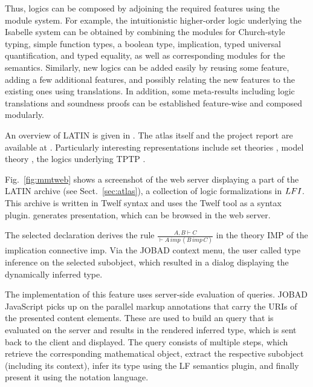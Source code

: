 Thus, logics can be composed by adjoining the required features using the {\mmt} module system.
For example, the intuitionistic higher-order logic underlying the Isabelle system \cite{isabelle} can be obtained by combining the modules for Church-style typing, simple function types, a boolean type, implication, typed universal quantification, and typed equality, as well as corresponding modules for the semantics.
Similarly, new logics can be added easily by reusing some feature, adding a few additional features, and possibly relating the new features to the existing ones using translations.
In addition, some meta-results including logic translations and soundness proofs can be established feature-wise and composed modularly.


An overview of LATIN is given in \cite{CHKMR:latinabs:11}.
The atlas itself and the project report are available at \cite{project:latin}.
Particularly interesting representations include set theories \cite{IR:foundations:10}, model theory \cite{HR:folsound:10}, the logics underlying TPTP \cite{BRS:tptphol:08}.

Fig.~\ref{fig:mmtweb} shows a screenshot of the {\mmt} web server displaying a part of the LATIN archive (see Sect.~\ref{sec:atlas}), a collection of logic formalizations in $LFI$.
This {\mmt} archive is written in Twelf syntax and uses the Twelf tool as a syntax plugin.
{\mmt} generates presentation, which can be browsed in the {\mmt} web server.

The selected declaration derives the rule $\frac{A,B\vdash C}{\vdash A\, imp\, (B\,imp\, C)}$ in the theory $\mathrm{IMP}$ of the implication connective $\mathrm{imp}$.
Via the JOBAD context menu, the user called type inference on the selected subobject, which resulted in a dialog displaying the dynamically inferred type.

The implementation of this feature uses server-side evaluation of {\mmt} queries.
JOBAD JavaScript picks up on the parallel markup annotations that carry the {\mmt} URIs of the presented content elements.
These are used to build an {\mmt} query that is evaluated on the server and results in the rendered inferred type, which is sent back to the client and displayed.
The query consists of multiple steps, which retrieve the corresponding mathematical object, extract the respective subobject (including its context), infer its type using the LF semantics plugin, and finally present it using the notation language.
\medskip

